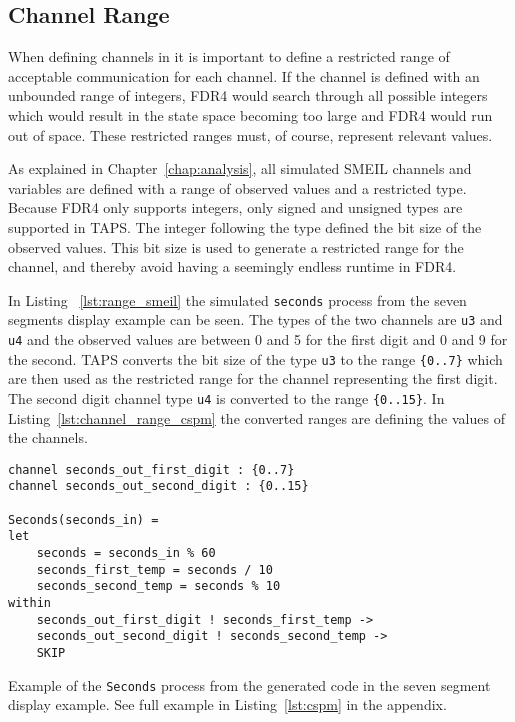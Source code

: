 \subsection{\cspm{} Channel Range}
When defining channels in \cspm{} it is important to define a restricted range of acceptable communication for each channel. If the channel is defined with an unbounded range of integers, FDR4 would search through all possible integers which would result in the state space becoming too large and FDR4 would run out of space. These restricted ranges must, of course, represent relevant values.

As explained in Chapter~\ref{chap:analysis}, all simulated SMEIL channels and variables are defined with a range of observed values and a restricted type.
Because FDR4 only supports integers, only signed and unsigned types are supported in TAPS. The integer following the type defined the bit size of the observed values. This bit size is used to generate a restricted range for the \cspm{} channel, and thereby avoid having a seemingly endless runtime in FDR4.

In Listing ~\ref{lst:range_smeil} the simulated \texttt{seconds} process from the seven segments display example can be seen. The types of the two channels are \texttt{u3} and \texttt{u4} and the observed values are between 0 and 5 for the first digit and 0 and 9 for the second. TAPS converts the bit size of the type \texttt{u3} to the range \texttt{\{0..7\}} which are then used as the restricted range for the \cspm{} channel representing the first digit. The second digit channel type \texttt{u4} is converted to the range \texttt{\{0..15\}}.  In Listing~\ref{lst:channel_range_cspm} the converted ranges are defining the values of the \cspm{} channels.

\begin{listing}
\begin{verbatim}
channel seconds_out_first_digit : {0..7}
channel seconds_out_second_digit : {0..15}

Seconds(seconds_in) =
let
    seconds = seconds_in % 60
    seconds_first_temp = seconds / 10
    seconds_second_temp = seconds % 10
within
    seconds_out_first_digit ! seconds_first_temp ->
    seconds_out_second_digit ! seconds_second_temp ->
    SKIP
\end{verbatim}
\caption{Example of the \texttt{Seconds} process from the generated \cspm{} code in the seven segment display example. See full example in Listing~\ref{lst:cspm} in the appendix.}
\label{lst:channel_range_cspm}
\end{listing}

